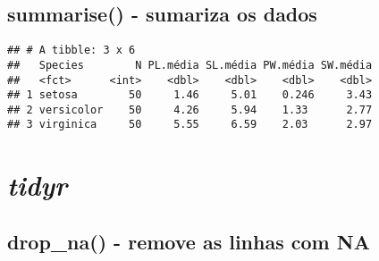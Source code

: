 \documentclass[]{book}
\newenvironment{Shaded}{\begin{snugshade}}{\end{snugshade}}
\newcommand{\DataTypeTok}[1]{\textcolor[rgb]{0.13,0.29,0.53}{#1}}
\newcommand{\KeywordTok}[1]{\textcolor[rgb]{0.13,0.29,0.53}{\textbf{#1}}}
\newcommand{\NormalTok}[1]{#1}
\newcommand{\OperatorTok}[1]{\textcolor[rgb]{0.81,0.36,0.00}{\textbf{#1}}}
\newcommand{\StringTok}[1]{\textcolor[rgb]{0.31,0.60,0.02}{#1}}
\begin{document}
\hypertarget{summarise---sumariza-os-dados}{%
\section{summarise() - sumariza os dados}\label{summarise---sumariza-os-dados}}

\begin{Shaded}
\end{Shaded}

\begin{verbatim}
## # A tibble: 3 x 6
##   Species        N PL.média SL.média PW.média SW.média
##   <fct>      <int>    <dbl>    <dbl>    <dbl>    <dbl>
## 1 setosa        50     1.46     5.01    0.246     3.43
## 2 versicolor    50     4.26     5.94    1.33      2.77
## 3 virginica     50     5.55     6.59    2.03      2.97
\end{verbatim}

\hypertarget{tidyr}{%
\chapter{\texorpdfstring{\emph{tidyr}}{tidyr}}\label{tidyr}}

\hypertarget{drop_na---remove-as-linhas-com-na}{%
\section{drop\_na() - remove as linhas com NA}\label{drop_na---remove-as-linhas-com-na}}

\begin{Shaded}
\end{Shaded}
\end{document}
